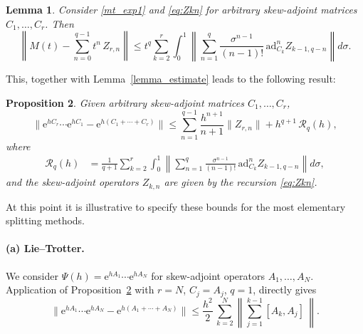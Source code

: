 \documentclass[11pt]{article}
\newcommand{\e}{\ensuremath{\mathrm{e}}}
\newcommand{\ad}{\ensuremath{\mathrm{ad}}}
\newtheorem{lemma}{Lemma}[section]
\newtheorem{proposition}[lemma]{Proposition}
\begin{document}
\begin{lemma}
\label{l:M(t)}
Consider \eqref{mt_exp1} and \eqref{eq:Zkn} for arbitrary skew-adjoint matrices $C_1,\ldots,C_r$.  Then 
\begin{equation*}
\left\| M(t) - \sum_{n=0}^{q-1} t^n \, Z_{r,n}  \right\| \leq 
t^q \sum_{k=2}^r 
\int_0^1
\left\|
 \sum_{n=1}^{q} \frac{\sigma^{n-1}}{(n-1)!} \, \ad_{C_k}^n Z_{k-1,q-n} 
\right\|
d\sigma.
\end{equation*}
\end{lemma}



This, together with Lemma~\ref{lemma_estimate} leads to the following result:

\begin{proposition} \label{p:basic_comm}
Given arbitrary skew-adjoint matrices $C_1,\ldots,C_r$,
\[
\| \e^{h C_r}\cdots \e^{h C_1} - \e^{h (C_1 + \cdots + C_r)} \| \leq \sum_{n=1}^{q-1}  \frac{h^{n+1}}{n+1} \| Z_{r,n} \| + h^{q+1} \, \mathcal{R}_q(h),
\]
where 
\begin{equation}
\label{eq:R_q}
\begin{aligned}
\mathcal{R}_q(h) &= \frac{1}{q+1}
 \sum_{k=2}^r \int_0^1
\left\|
 \sum_{n=1}^{q} \frac{\sigma^{n-1}}{(n-1)!} \, \ad_{C_k}^n Z_{k-1,q-n} 
\right\|
d\sigma,
\end{aligned}
\end{equation}
and the skew-adjoint operators $Z_{k,n}$ are given by the recursion \eqref{eq:Zkn}.
\end{proposition}




At this point it is illustrative to specify these bounds for the most elementary splitting methods.

\paragraph{(a) Lie--Trotter.} We consider $\Psi(h) = \e^{h A_1} \cdots \e^{h A_N}$ for skew-adjoint operators $A_1,\ldots,A_N$. Application of Proposition~\ref{p:basic_comm} with $r=N$, $C_j = A_j$, $q=1$, directly gives
\[
  \| \e^{h A_1} \cdots \e^{h A_N} - \e^{h (A_1 +\cdots + A_N)} \| \leq  \frac{h^2}{2} \, \sum_{k=2}^{N}
 \left\|  \sum_{j=1}^{k-1}   [A_k,  A_j] \, \right\|.
   \] 
   
\end{document}
